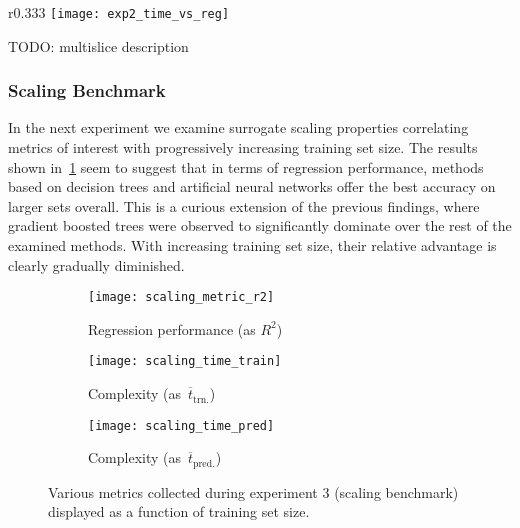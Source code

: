 
\newpage
\begin{wrapfigure}{r}{0.333\textwidth}
	\centering
	\vspace{-3ex}
	\texttt{[image: exp2\_time\_vs\_reg]}
	\caption{Results of experiment~2, plotted analogously
	to~\cref{fig:exp1-time-vs-reg}.}
	\label{fig:exp2-time-vs-reg}
	\vspace{-4ex}
\end{wrapfigure}

TODO: multislice description

\subsubsection{Scaling Benchmark}

In the next experiment we examine surrogate scaling properties correlating
metrics of interest with progressively increasing training set size. The results
shown in~\cref{fig:scaling} seem to suggest that in terms of regression performance,
methods based on decision trees and artificial neural networks offer the best accuracy on
larger sets overall. This is a curious extension of the previous findings, where
gradient boosted trees were observed to significantly dominate over the rest of
the examined methods. With increasing training set size, their relative advantage is
clearly gradually diminished.

\begin{figure}[h]
	\centering
	\begin{subfigure}[b]{0.333\textwidth}
		\centering
		\texttt{[image: scaling\_metric\_r2]}
		\caption{Regression performance (as $R^2$)}
	\end{subfigure}\hfill%
	\begin{subfigure}[b]{0.333\textwidth}
		\centering
		\texttt{[image: scaling\_time\_train]}
		\caption{Complexity (as~$\overline{t}_{\text{trn.}}$)}
	\end{subfigure}\hfill%
	\begin{subfigure}[b]{0.333\textwidth}
		\centering
		\texttt{[image: scaling\_time\_pred]}
		\caption{Complexity (as~$\overline{t}_{\text{pred.}}$)}
	\end{subfigure}
	\caption{Various metrics collected during experiment 3 (scaling
	benchmark) displayed as a function of training set size.}
	\label{fig:scaling}
\end{figure}


